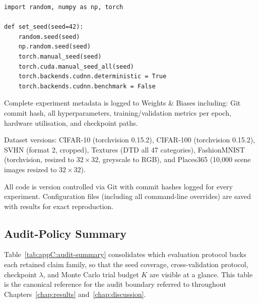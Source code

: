 \begin{verbatim}
import random, numpy as np, torch

def set_seed(seed=42):
    random.seed(seed)
    np.random.seed(seed)
    torch.manual_seed(seed)
    torch.cuda.manual_seed_all(seed)
    torch.backends.cudnn.deterministic = True
    torch.backends.cudnn.benchmark = False
\end{verbatim}

Complete experiment metadata is logged to Weights \& Biases including: Git commit hash, all hyperparameters, training/validation metrics per epoch, hardware utilisation, and checkpoint paths.

Dataset versions: CIFAR-10 (torchvision 0.15.2), CIFAR-100 (torchvision 0.15.2), SVHN (format 2, cropped), Textures (DTD all 47 categories), FashionMNIST (torchvision, resized to $32 \times 32$, greyscale to RGB), and Places365 (10,000 scene images resized to $32 \times 32$).

All code is version controlled via Git with commit hashes logged for every experiment. Configuration files (including all command-line overrides) are saved with results for exact reproduction.

\subsection{Audit-Policy Summary}
\label{app:experimental-config:audit-summary}

Table~\ref{tab:appC:audit-summary} consolidates which evaluation protocol backs each retained claim family, so that the seed coverage, cross-validation protocol, checkpoint $\lambda$, and Monte Carlo trial budget $K$ are visible at a glance. This table is the canonical reference for the audit boundary referred to throughout Chapters~\ref{chap:results} and~\ref{chap:discussion}.

